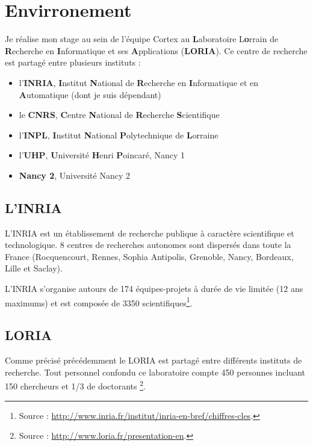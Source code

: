 \chapter{Envirronement} %
\label{cha:Envirronement}

Je réalise mon stage au sein de l'équipe Cortex au \textbf{L}aboratoire L\textbf{o}rrain de
\textbf{R}echerche en \textbf{I}nformatique et ses \textbf{A}pplications (\textbf{LORIA}).
Ce centre de recherche est partagé entre plusieurs instituts :
\begin{itemize}
   \item l'\textbf{INRIA}, \textbf{I}nstitut \textbf{N}ational de \textbf{R}echerche en \textbf{I}nformatique
      et en \textbf{A}utomatique (dont je suis dépendant)
   \item le \textbf{CNRS}, \textbf{C}entre \textbf{N}ational de \textbf{R}echerche \textbf{S}cientifique
   \item l'\textbf{INPL}, \textbf{I}nstitut \textbf{N}ational \textbf{P}olytechnique de \textbf{L}orraine
   \item l'\textbf{UHP}, \textbf{U}niversité \textbf{H}enri \textbf{P}oincaré, Nancy 1
   \item \textbf{Nancy 2}, Université Nancy 2
\end{itemize}

\section{L'INRIA} %
\label{sec:L'INRIA}

L'INRIA est un établissement de recherche publique à caractère scientifique et technologique. 8 centres de
recherches autonomes sont dispersés dans toute la France (Rocquencourt, Rennes, Sophia Antipolis, Grenoble,
Nancy, Bordeaux, Lille et Saclay).

L'INRIA s'organise autours de 174 équipes-projets à durée de vie limitée (12 ans maximums) et est composée
de 3350 scientifiques\footnote{Source : \url{http://www.inria.fr/institut/inria-en-bref/chiffres-cles}.}.


\section{LORIA} %
\label{sec:LORIA}

Comme précisé précédemment le LORIA est partagé entre différents instituts de recherche. Tout personnel confondu
ce laboratoire compte 450 personnes incluant 150 chercheurs et 1/3 de doctorants
\footnote{Source : \url{http://www.loria.fr/presentation-en}.}.

